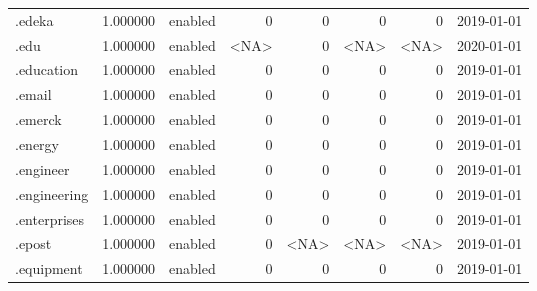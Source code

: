 \begin{tabular}{lrlrrrrl}
.edeka                    &          1.000000 &         enabled &                           0 &                           0 &                           0 &                   0 &           2019-01-01 \\
.edu                      &          1.000000 &         enabled &                        <NA> &                           0 &                        <NA> &                <NA> &           2020-01-01 \\
.education                &          1.000000 &         enabled &                           0 &                           0 &                           0 &                   0 &           2019-01-01 \\
.email                    &          1.000000 &         enabled &                           0 &                           0 &                           0 &                   0 &           2019-01-01 \\
.emerck                   &          1.000000 &         enabled &                           0 &                           0 &                           0 &                   0 &           2019-01-01 \\
.energy                   &          1.000000 &         enabled &                           0 &                           0 &                           0 &                   0 &           2019-01-01 \\
.engineer                 &          1.000000 &         enabled &                           0 &                           0 &                           0 &                   0 &           2019-01-01 \\
.engineering              &          1.000000 &         enabled &                           0 &                           0 &                           0 &                   0 &           2019-01-01 \\
.enterprises              &          1.000000 &         enabled &                           0 &                           0 &                           0 &                   0 &           2019-01-01 \\
.epost                    &          1.000000 &         enabled &                           0 &                        <NA> &                        <NA> &                <NA> &           2019-01-01 \\
.equipment                &          1.000000 &         enabled &                           0 &                           0 &                           0 &                   0 &           2019-01-01 \\

\end{tabular}
